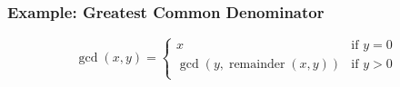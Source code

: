 \documentclass{beamer}
\begin{document}
\begin{frame}[fragile]
    \frametitle{Example: Greatest Common Denominator}
    \[
    \gcd(x,y) =
    \begin{cases}
         x & \mbox{if } y = 0 \\
         \gcd(y, \operatorname{remainder}(x,y)) & \mbox{if } y > 0 \\
     \end{cases}
     \]
      \only<+->{\gcdImplementation}
\end{frame}
\end{document}
